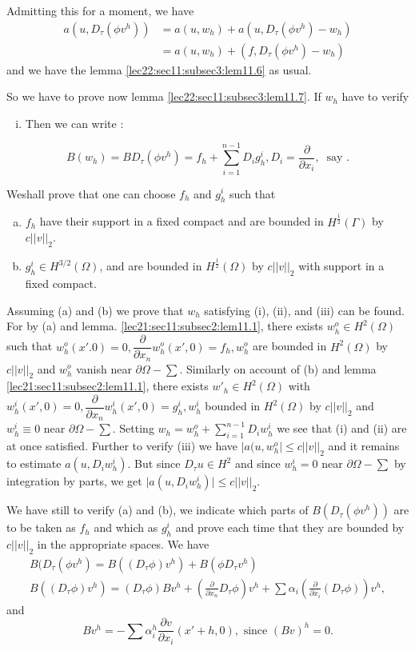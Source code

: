Admitting this for a moment, we have
\begin{align*}
  a(u, D_\tau (\phi v^h)) & = a(u, w_h) + a(u, D_\tau (\phi v^h) - w_h)\\
  & = a(u, w_h) + (f, D_\tau (\phi v^h) - w_h)
\end{align*}
and we have the lemma \ref{lec22:sec11:subsec3:lem11.6} as usual. 

So we have to prove now lemma \ref{lec22:sec11:subsec3:lem11.7}. If $w_h$ have to verify 
\begin{enumerate}[i)]
\item Then we can write :
\end{enumerate}
$$
B(w_h) = B D_\tau (\phi v^h) = f_h + \sum_{i = 1}^{n - 1} D_i g^i_h,
D_i = \frac{\partial}{\partial x_i}, ~\text { say }.  
$$

We\pageoriginale shall prove that one can choose $f_h$ and $g^i_h$ such that
\begin{enumerate}[a)]
\item $f_h$ have their support in a fixed compact and are bounded in
  $H^{\frac{1}{2}} (\Gamma)$ by $c || v ||_2$.  
\item $g^i_h \in H^{3/2} (\Omega)$, and are bounded in
  $H^{\frac{1}{2}} (\Omega)$ by $c || v ||_2$ with support in a fixed
  compact.  
\end{enumerate}

Assuming (a) and (b) we prove that $w_h$ satisfying (i), (ii),
and (iii) can be found. For by (a) and lemma. \ref{lec21:sec11:subsec2:lem11.1}, there
exists $w^o_h \in H^2 (\Omega)$ such that $w^o_h (x'. 0) = 0,
\dfrac{\partial}{\partial x_n} w^o_h (x', 0) = f_h, w^o_h$ are bounded
in $H^2 (\Omega)$ by $c || v ||_2$ 
 and $w^o_h$ vanish near $\partial \Omega - \sum$. Similarly on
 account of (b) and lemma \ref{lec21:sec11:subsec2:lem11.1}, there exists $w'_h \in
 H^2 (\Omega)$ with $w^i_h (x' , 0) = 0, \dfrac{\partial}{\partial
   x_n} w^i_h (x', 0) = g^i_h, w_h^i$ bounded in $H^2 (\Omega)$ by $c
 || v ||_2$ and $w^i_h \equiv 0$ near $\partial \Omega -
 \sum$. Setting $w_h = w^o_h + \sum_{i = 1}^{n - 1} D_i w^i_h$ we see
 that (i) and (ii) are at once satisfied. Further to verify
 (iii) we have $\big | a (u, w^o_h \big | \leq c || v ||_2$ and it
 remains to estimate $a(u, D_i w^i_h)$. But since $D_\tau u
 \in H^2$ and since $w^i_h = 0$ near $\partial \Omega - \sum$
 by integration by parts, we get $\big |a (u, D_i w^i_h) \big | \leq c
 || v ||_2$.  

We have still to verify (a) and (b), we indicate which parts of
$B(D_\tau (\phi v^h))$ are to be taken as $f_h$ and which as $g^i_h$
and prove each time that they are bounded by $c || v ||_2$ in the
appropriate spaces. We have 
\begin{gather*}
  B(D_\tau (\phi v^h) = B((D_\tau \phi ) v^h ) + B(\phi D_\tau v^h)\\
  B((D_\tau \phi ) v^h) = (D_\tau \phi ) B v^h +
  \left(\frac{\partial}{\partial x_n} D_\tau \phi \right) v^h + \sum \alpha_i
  \left(\frac{\partial}{\partial x_i} (D_\tau \phi )\right) v^h,  
\end{gather*}
and 
$$
Bv^h = -\sum\alpha^h_i \frac{\partial v}{\partial x_i} (x' + h, 0),
\text{ since } (Bv)^h = 0. 
$$ 

